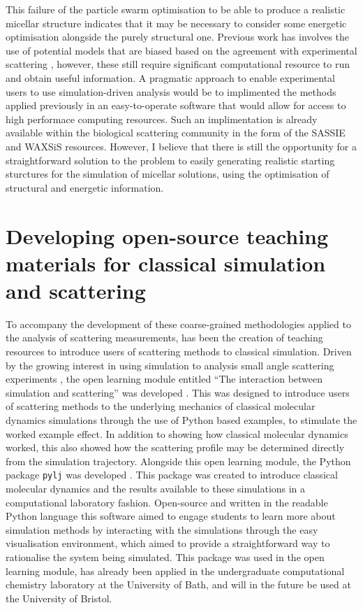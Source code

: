 This failure of the particle swarm optimisation to be able to produce a realistic micellar structure indicates that it may be necessary to consider some energetic optimisation alongside the purely structural one.
Previous work has involves the use of potential models that are biased based on the agreement with experimental scattering \cite{hargreaves_atomistic_2011,ivanovic_temperature-dependent_2018}, however, these still require significant computational resource to run and obtain useful information.
A pragmatic approach to enable experimental users to use simulation-driven analysis would be to implimented the methods applied previously in an easy-to-operate software that would allow for access to high performace computing resources.
Such an implimentation is already available within the biological scattering community in the form of the SASSIE \cite{perkins_atomistic_2016} and WAXSiS \cite{knight_waxsis_2015} resources.
However, I believe that there is still the opportunity for a straightforward solution to the problem to easily generating realistic starting sturctures for the simulation of micellar solutions, using the optimisation of structural and energetic information.

\section{Developing open-source teaching materials for classical simulation and scattering}
To accompany the development of these coarse-grained methodologies applied to the analysis of scattering measurements, has been the creation of teaching resources to introduce users of scattering methods to classical simulation.
Driven by the growing interest in using simulation to analysis small angle scattering experiments \cite{hub_interpreting_2018,perkins_atomistic_2016}, the open learning module entitled ``The interaction between simulation and scattering'' was developed \cite{mccluskey_pythoninchemistry/sim_and_scat_2019}.
This was designed to introduce users of scattering methods to the underlying mechanics of classical molecular dynamics simulations through the use of Python based examples, to stimulate the worked example effect.
In addition to showing how classical molecular dynamics worked, this also showed how the scattering profile may be determined directly from the simulation trajectory.
Alongside this open learning module, the Python package \texttt{pylj} was developed \cite{mccluskey_pylj_2018,mccluskey_arm61/pylj_2019-2}.
This package was created to introduce classical molecular dynamics and the results available to these simulations in a computational laboratory fashion.
Open-source and written in the readable Python language this software aimed to engage students to learn more about simulation methods by interacting with the simulations through the easy visualisation environment, which aimed to provide a straightforward way to rationalise the system being simulated.
This package was used in the open learning module, has already been applied in the undergraduate computational chemistry laboratory at the University of Bath, and will in the future be used at the University of Bristol.

